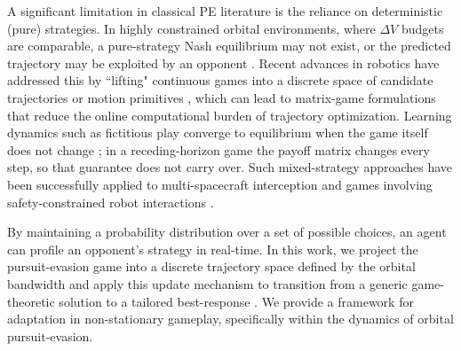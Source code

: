 A significant limitation in classical PE literature is the reliance on deterministic (pure) strategies. In highly constrained orbital environments, where $\Delta V$ budgets are comparable, a pure-strategy Nash equilibrium may not exist, or the predicted trajectory may be exploited by an opponent \cite{hanlongResearchStrategiesMultiSpacecraft2024}. Recent advances in robotics have addressed this by ``lifting" continuous games into a discrete space of candidate trajectories or motion primitives \cite{peters2022learning}, which can lead to matrix-game formulations that reduce the online computational burden of trajectory optimization. Learning dynamics such as fictitious play converge to equilibrium when the game itself does not change \cite{perrin_fictitious_2020, harris_rate_1998}; in a receding-horizon game the payoff matrix changes every step, so that guarantee does not carry over. Such mixed-strategy approaches have been successfully applied to multi-spacecraft interception \cite{hanlongResearchStrategiesMultiSpacecraft2024} and games involving safety-constrained robot interactions \cite{krusniak_mixed_2025}. 


By maintaining a probability distribution over a set of possible choices, an agent can profile an opponent's strategy in real-time. 
In this work, we project the pursuit-evasion game into a discrete trajectory space defined by the orbital bandwidth and apply this update mechanism to transition from a generic game-theoretic solution to a tailored best-response \cite{swenson_best-response_2018, guan_best_2025}. We provide a framework for adaptation in non-stationary gameplay, specifically within the dynamics of orbital pursuit-evasion.



